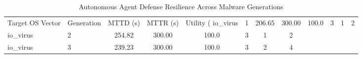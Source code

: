 \begin{table}[htbp]
\centering
\caption{Autonomous Agent Defense Resilience Across Malware Generations}
\label{tab:resilience_metrics}
\begin{tabular}{llcccccc}
\toprule
\midrule
Target OS Vector & Generation & MTTD (s) & MTTR (s) & Utility (%
\midrule
io_virus & 1 & 206.65 & 300.00 & 100.0 & 3 & 1 & 2 \\
io_virus & 2 & 254.82 & 300.00 & 100.0 & 3 & 1 & 2 \\
io_virus & 3 & 239.23 & 300.00 & 100.0 & 3 & 2 & 4 \\
\bottomrule
\end{tabular}
\end{table}
